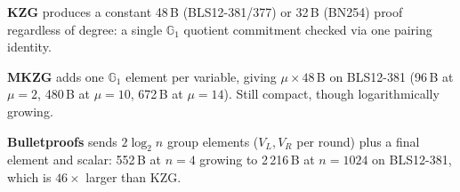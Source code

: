 \begin{table}[H]
\centering
\caption{Proof size (bytes) at representative sizes.
KZG: one $\mathbb{G}_1$ element ($O(1)$);
MKZG: $\mu$ elements ($O(\log n)$);
Bulletproofs: $2\log_2 n + 1$ elements ($O(\log n)$);
Dory: $\sigma$ rounds of $\mathbb{G}_T$, $\mathbb{G}_1$, $\mathbb{G}_2$ elements ($O(\log n)$).}
\label{tab:proofsize-all}
%
\end{table}

\textbf{KZG} produces a constant 48\,B (BLS12-381/377) or 32\,B
(BN254) proof regardless of degree: a single $\mathbb{G}_1$ quotient
commitment checked via one pairing identity.

\textbf{MKZG} adds one $\mathbb{G}_1$ element per variable, giving
$\mu \times 48$\,B on BLS12-381 (96\,B at $\mu=2$, 480\,B at $\mu=10$,
672\,B at $\mu=14$). Still compact, though logarithmically growing.

\textbf{Bulletproofs} sends $2\log_2 n$ group elements ($V_L, V_R$
per round) plus a final element and scalar: 552\,B at $n=4$ growing
to 2\,216\,B at $n=1024$ on BLS12-381, which is $46\times$ larger than
KZG.

